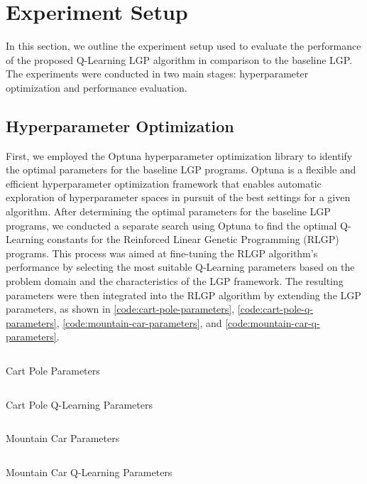 \documentclass[12pt, final]{dalcsthesis}
\begin{document}
\section{Experiment Setup}

In this section, we outline the experiment setup used to evaluate the performance of the proposed Q-Learning LGP algorithm in comparison to the baseline LGP. The experiments were conducted in two main stages: hyperparameter optimization and performance evaluation.

\subsection{Hyperparameter Optimization}
First, we employed the Optuna hyperparameter optimization library \cite{akiba2019optuna} to identify the optimal parameters for the baseline LGP programs.
Optuna is a flexible and efficient hyperparameter optimization framework that enables automatic exploration of hyperparameter spaces in pursuit of the best settings for a given algorithm.
After determining the optimal parameters for the baseline LGP programs, we conducted a separate search using Optuna to find the optimal Q-Learning constants for the Reinforced Linear Genetic Programming (RLGP) programs.
This process was aimed at fine-tuning the RLGP algorithm's performance by selecting the most suitable Q-Learning parameters based on the problem domain and the characteristics of the LGP framework.
The resulting parameters were then integrated into the RLGP algorithm by extending the LGP parameters, as shown in \ref{code:cart-pole-parameters}, \ref{code:cart-pole-q-parameters}, \ref{code:mountain-car-parameters}, and \ref{code:mountain-car-q-parameters}.

\begin{listing}[b]
	\centering
	\inputminted[breaklines]{json}{../assets/parameters/cart-pole-lgp.json}
	\caption{Cart Pole Parameters}
	\label{code:cart-pole-parameters}
\end{listing}
\begin{listing}[b]
	\centering
	\inputminted[breaklines]{json}{../assets/parameters/cart-pole-q.json}
	\caption{Cart Pole Q-Learning Parameters}
	\label{code:cart-pole-q-parameters}
\end{listing}
\begin{listing}[b]
	\centering
	\inputminted[breaklines]{json}{../assets/parameters/mountain-car-lgp.json}
	\caption{Mountain Car Parameters}
	\label{code:mountain-car-parameters}
\end{listing}
\begin{listing}[b]
	\centering
	\inputminted[breaklines]{json}{../assets/parameters/mountain-car-q.json}
	\caption{Mountain Car Q-Learning Parameters}
	\label{code:mountain-car-q-parameters}
\end{listing}
\end{document}
